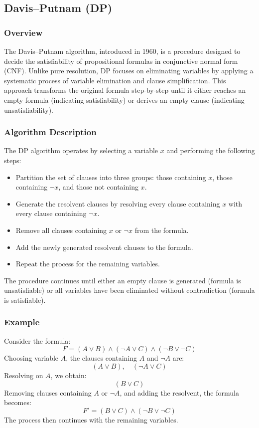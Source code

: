 \documentclass{article}
\begin{document}
\subsection{Davis–Putnam (DP)}

\subsubsection{Overview}
The Davis–Putnam algorithm, introduced in 1960, is a procedure designed to decide the satisfiability of propositional formulas in conjunctive normal form (CNF). Unlike pure resolution, DP focuses on eliminating variables by applying a systematic process of variable elimination and clause simplification. This approach transforms the original formula step-by-step until it either reaches an empty formula (indicating satisfiability) or derives an empty clause (indicating unsatisfiability).

\subsubsection{Algorithm Description}
The DP algorithm operates by selecting a variable \(x\) and performing the following steps:
\begin{itemize}
    \item Partition the set of clauses into three groups: those containing \(x\), those containing \(\neg x\), and those not containing \(x\).
    \item Generate the resolvent clauses by resolving every clause containing \(x\) with every clause containing \(\neg x\).
    \item Remove all clauses containing \(x\) or \(\neg x\) from the formula.
    \item Add the newly generated resolvent clauses to the formula.
    \item Repeat the process for the remaining variables.
\end{itemize}

The procedure continues until either an empty clause is generated (formula is unsatisfiable) or all variables have been eliminated without contradiction (formula is satisfiable).

\subsubsection{Example}
Consider the formula:
\[
F = (A \lor B) \land (\neg A \lor C) \land (\neg B \lor \neg C)
\]
Choosing variable \(A\), the clauses containing \(A\) and \(\neg A\) are:
\[
(A \lor B), \quad (\neg A \lor C)
\]
Resolving on \(A\), we obtain:
\[
(B \lor C)
\]
Removing clauses containing \(A\) or \(\neg A\), and adding the resolvent, the formula becomes:
\[
F' = (B \lor C) \land (\neg B \lor \neg C)
\]
The process then continues with the remaining variables.
\end{document}

